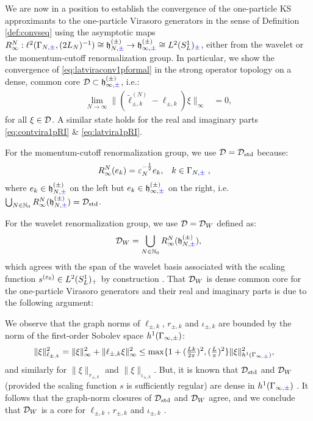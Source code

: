 \documentclass[a4paper, 11pt]{article}
\newcommand{\fh}{\mathfrak{h}}
\newcommand{\ltwo}{\ell^{2}}
\DeclareMathOperator{\1}{\mathds{1}}
\DeclareMathOperator{\std}{std}
\begin{document}
We are now in a position to establish the convergence of the one-particle KS approximants to the one-particle Virasoro generators in the sense of Definition \ref{def:convseq} using the asymptotic maps $R^{N}_{\infty}:\ltwo(\Gamma_{N,{\color{blue}\pm}},(2L_{N})^{-1})\cong\fh^{(\pm)}_{N,{\color{blue}\pm}}\rightarrow\fh^{(\pm)}_{\infty,{\color{blue}\pm}}\cong L^{2}(S^{1}_{L})_{{\color{blue}\pm}}$, either from the wavelet or the momentum-cutoff renormalization group. In particular, we show the convergence of \eqref{eq:latviraconv1pformal} in the strong operator topology on a dense, common core $\cD\subset\fh^{(\pm)}_{\infty,{\color{blue}\pm}}$, i.e.:
\begin{align}
\label{eq:latviraconv1p}
\lim_{N\rightarrow\infty}\|(\tilde{\ell}^{(N)}_{\pm,k} - \ell_{\pm,k})\xi\|_{\infty} & = 0,
\end{align}
for all $\xi\in\mathcal{D}$. A similar state holds for the real and imaginary parts \eqref{eq:contvira1pRI} \& \eqref{eq:latvira1pRI}.

\medskip

For the momentum-cutoff renormalization group, we use $\cD=\cD_{\std}$ because:
\begin{align}
\label{eq:momdominv}
R^{N}_{\infty}(e_{k}) & = \varepsilon_{N}^{-\frac{1}{2}}e_{k}, & k&\in\Gamma_{N,{\color{blue}\pm}}\;,
\end{align}
where $e_{k}\in\fh^{(\pm)}_{N,{\color{blue}\pm}}$ on the left but $e_{k}\in\fh^{(\pm)}_{\infty,{\color{blue}\pm}}$ on the right, i.e.~$\bigcup_{N\in\N_{0}}R^{N}_{\infty}(\fh^{(\pm)}_{N,{\color{blue}\pm}})=\cD_{\std}$.

\medskip

For the wavelet renormalization group, we use $\mathcal{D}=\mathcal{D}_{W}$ defined as:
\begin{align}
\label{eq:waveletdom}
\cD_{W} = \bigcup_{N\in\N_{0}}R^{N}_{\infty}(\fh^{(\pm)}_{N,{\color{blue}\pm}}),
\end{align}
which agrees with the span of the wavelet basis associated with the scaling function $s^{(\varepsilon_{0})}\in L^{2}(S^{1}_{L})_{+}$ by construction \cite{DaubechiesTenLecturesOn}. That $\mathcal{D}_{W}$ is dense common core for the one-particle Virasoro generators and their real and imaginary parts is due to the following argument: 

We observe that the graph norms of $\ell_{\pm,k} $, $r_{\pm,k}$ and $\iota_{\pm,k}$ are bounded by the norm of the first-order Sobolev space $h^{1}(\Gamma_{\infty,{\color{blue}\pm}})$:
\begin{align*}
\|\xi\|_{\ell_{\pm,k}}^{2} & = \|\xi\|_{\infty}^{2}+\|\ell_{\pm,k}\xi\|_{\infty}^{2} \leq \max\{1+(\tfrac{L k}{2\pi})^{2},(\tfrac{L}{\pi})^{2}\}\|\xi\|_{h^{1}(\Gamma_{\infty,{\color{blue}\pm}})}^{2},
\end{align*}
and similarly for $\|\xi\|_{r_{\pm,k}}$ and $\|\xi\|_{\iota_{\pm,k}}$. But, it is known that $\cD_{\std}$ and $\mathcal{D}_{W}$ (provided the scaling function $s$ is sufficiently regular) are dense in $h^{1}(\Gamma_{\infty,{\color{blue}\pm}})$ \cite{WASA}. It follows that the graph-norm closures of $\cD_{\std}$ and $\mathcal{D}_{W}$ agree, and we conclude that $\mathcal{D}_{W}$ is a core for $\ell_{\pm,k}$, $r_{\pm,k}$ and $\iota_{\pm,k}$ \cite{ReedMethodsOfModern1}.
\end{document}
